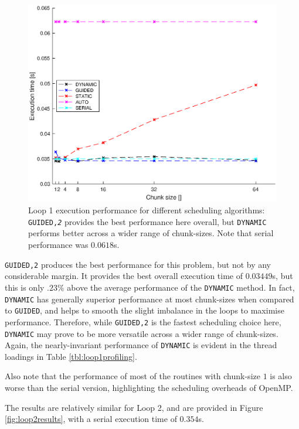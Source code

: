 \documentclass{article} %
\newcommand{\tp}{\texttt}
\begin{document}
\begin{figure}
    \centering
    \includegraphics[height=.35\textheight]{part1_plots/all_part1.eps}
    \caption{Loop 1 execution performance for different scheduling algorithms: \tp{GUIDED,\textit{2}} provides the best performance here overall, but \tp{DYNAMIC} performs better across a wider range of chunk-sizes. Note that serial performance was $0.0618$s.}
    \label{fig:loop1results}
\end{figure} 

\tp{GUIDED,2} produces the best performance for this problem, but not by any considerable margin.
It provides the best overall execution time of $0.03449$s, but this is only $.23\%$ above the average performance of the \tp{DYNAMIC} method. 
In fact, \tp{DYNAMIC} has generally superior performance at most chunk-sizes when compared to \tp{GUIDED}, and helps to smooth the slight imbalance in the loops to maximise performance.
Therefore, while \tp{GUIDED,2} is the fastest scheduling choice here, \tp{DYNAMIC} may prove to be more versatile across a wider range of chunk-sizes.
Again, the nearly-invariant performance of \tp{DYNAMIC} is evident in the thread loadings in Table \ref{tbl:loop1profiling}.

Also note that the performance of most of the routines with chunk-size $1$ is also worse than the serial version, highlighting the scheduling overheads of OpenMP.

The results are relatively similar for Loop 2, and are provided in Figure \ref{fig:loop2results}, with a serial execution time of $0.354$s. 
\end{document}
